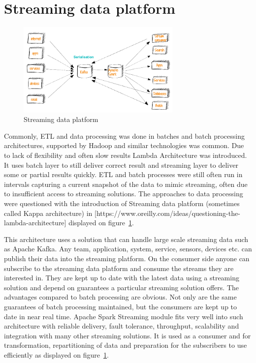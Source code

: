 \documentclass[a4paper, 10 pt, conference]{IEEEtran}
\begin{document}
\section{Streaming data platform}

\begin{figure}[hb]
	\begin{center}
		\caption{Streaming data platform}
		\label{fig:streamingDataPlatform}
		\includegraphics[width=8cm,keepaspectratio]{streaming-data-platform.png}
	\end{center}
\end{figure}

Commonly, ETL and data processing was done in batches and batch processing architectures, supported by Hadoop and similar technologies was common. Due to lack of flexibility and often slow results Lambda Architecture was introduced. It uses batch layer to still deliver correct result and streaming layer to deliver some or partial results quickly.
ETL and batch processes were still often run in intervals capturing a current snapshot of the data to mimic streaming, often due to insufficient access to streaming solutions. The approaches to data processing were questioned with the introduction of Streaming data platform (sometimes called Kappa architecture) in [https://www.oreilly.com/ideas/questioning-the-lambda-architecture] displayed on figure~\ref{fig:streamingDataPlatform}.

This architecture uses a solution that can handle large scale streaming data such as Apache Kafka. Any team, application, system, service, sensors, devices etc. can publish their data into the streaming platform. On the consumer side anyone can subscribe to the streaming data platform and consume the streams they are interested in. They are kept up to date with the latest data using a streaming solution and depend on guarantees a particular streaming solution offers.
The advantages compared to batch processing are obvious. Not only are the same guarantees of batch processing maintained, but the consumers are kept up to date in near real time.
Apache Spark Streaming module fits very well into such architecture with reliable delivery, fault tolerance, throughput, scalability and integration with many other streaming solutions. It is used as a consumer and for transformation, repartitioning of data and preparation for the subscribers to use efficiently as displayed on figure~\ref{fig:streamingDataPlatform}.
\end{document}
